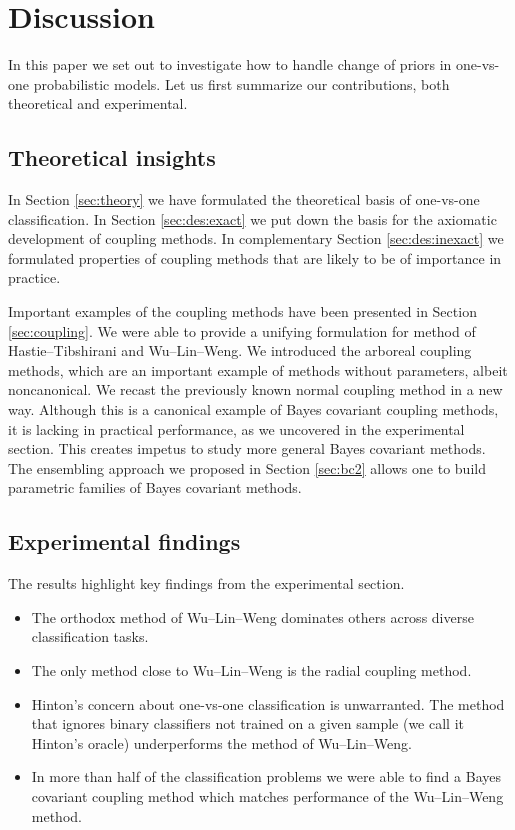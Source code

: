 \section{Discussion}

In this paper we set out to investigate how to handle change of priors in one-vs-one 
probabilistic models. Let us first summarize our contributions, 
both theoretical and experimental.

\subsection{Theoretical insights}

In Section \ref{sec:theory} we have formulated the theoretical basis of 
one-vs-one classification. In Section \ref{sec:des:exact} we put down the basis 
for the axiomatic development of coupling methods. 
In complementary Section \ref{sec:des:inexact} we formulated properties 
of coupling methods that are likely to be of importance in practice.

Important examples of the coupling methods have been presented in Section \ref{sec:coupling}. We were able to provide a unifying formulation for method of Hastie--Tibshirani and Wu--Lin--Weng. We introduced the arboreal coupling methods, which are an important example of methods without parameters, albeit noncanonical. We recast the previously known normal coupling method in a new way. Although this is a canonical example of Bayes covariant coupling methods,  it is lacking in practical performance, as  we uncovered in the experimental section. This creates impetus to study more general Bayes covariant methods. The  ensembling approach we proposed in Section \ref{sec:bc2} allows one to build parametric families of Bayes covariant methods.

\subsection{Experimental findings} 

The results highlight key findings from the experimental section.

\begin{itemize}
	\item The orthodox method of Wu--Lin--Weng dominates others across diverse classification tasks.
	\item The only method close to Wu--Lin--Weng is the radial coupling method.
	\item Hinton's concern about one-vs-one classification is unwarranted. The method that ignores binary classifiers not trained on a given sample (we call it Hinton's oracle) underperforms the method of Wu--Lin--Weng.
	\item In more than half of the classification problems we were able to find a Bayes covariant coupling method which matches performance of the Wu--Lin--Weng method. 
\end{itemize}



